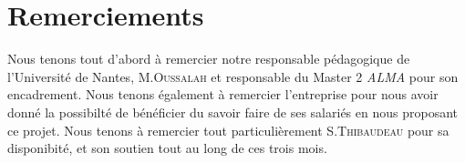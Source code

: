 \chapter*{Remerciements}
{}
Nous tenons tout d'abord à remercier notre responsable pédagogique de l'Université de Nantes, M.\textsc{Oussalah} et responsable du Master 2 \emph{ALMA} pour son encadrement.
Nous tenons également à remercier l’entreprise \kwobeo{} pour nous avoir donné la possibilté de bénéficier du savoir faire de ses salariés en nous proposant ce projet. Nous tenons à remercier tout particulièrement S.\textsc{Thibaudeau} pour sa disponibité, et son soutien tout au long de ces trois mois.

